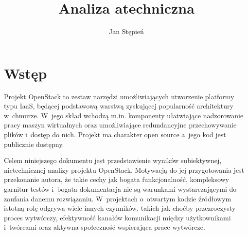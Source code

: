 \documentclass[a4paper,12pt]{article}
\title{Analiza atechniczna}
\author{Jan Stępień}
\begin{document}
	\maketitle

	\section{Wstęp}

	Projekt OpenStack to zestaw narzędzi umożliwiających utworzenie platformy
	typu IaaS, będącej podstawową warstwą zyskującej popularność architektury
	w~chmurze. W~jego skład wchodzą m.in. komponenty ułatwiające nadzorowanie
	pracy maszyn wirtualnych oraz umożliwiające redundancyjne przechowywanie
	plików i~dostęp do nich. Projekt ma charakter open source a~jego kod jest
	publicznie dostępny.

	Celem niniejszego dokumentu jest przedstawienie wyników subiektywnej,
	nietechnicznej analizy projektu OpenStack. Motywacją do jej przygotowania
	jest przekonanie autora, że takie cechy jak bogata funkcjonalność,
	kompleksowy garnitur testów i~bogata dokumentacja nie są warunkami
	wystarczającymi do zaufania danemu rozwiązaniu. W~projektach o~otwartym
	kodzie źródłowym istotną rolę odgrywa wiele innych czynników, takich jak
	choćby przezroczysty proces wytwórczy, efektywność kanałów komunikacji
	między użytkownikami i~twórcami oraz aktywna społeczność wspierająca prace
	wytwórcze.
\end{document}
